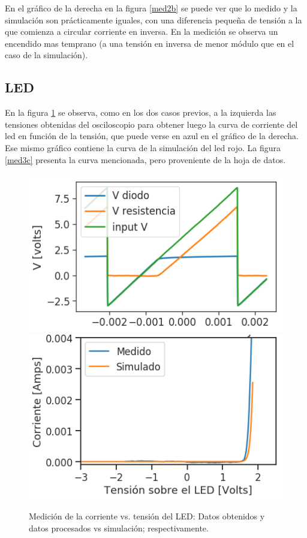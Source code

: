 
En el gr\'afico de la derecha en la figura \ref{med2b} se puede ver que lo medido y la simulaci\'on son pr\'acticamente iguales, con una diferencia pequeña de tensi\'on a la que comienza a circular corriente en inversa. En la medici\'on se observa un encendido mas temprano (a una tensi\'on en inversa de menor m\'odulo que en el caso de la simulaci\'on).

\subsection*{\color{orange}LED}

En la figura \ref{med3b} se observa, como en los dos casos previos, a la izquierda las tensiones obtenidas del osciloscopio para obtener luego la curva de corriente del led en funci\'on de la tensi\'on, que puede verse en azul en el gr\'afico de la derecha. Ese mismo gr\'afico contiene la curva de la simulaci\'on del led rojo. La figura \ref{med3c} presenta la curva mencionada, pero proveniente de la hoja de datos.

\begin{figure}[H]
\centering
\includegraphics[scale=0.5]{../EJ1/LED/datosOsciloscopioLED}
\includegraphics[scale=0.5]{../EJ1/LED/ledSuperpos}
\caption{Medici\'on de la corriente vs. tensi\'on del LED: Datos obtenidos y datos procesados vs simulaci\'on; respectivamente.}
\label{med3b}
\end{figure}

